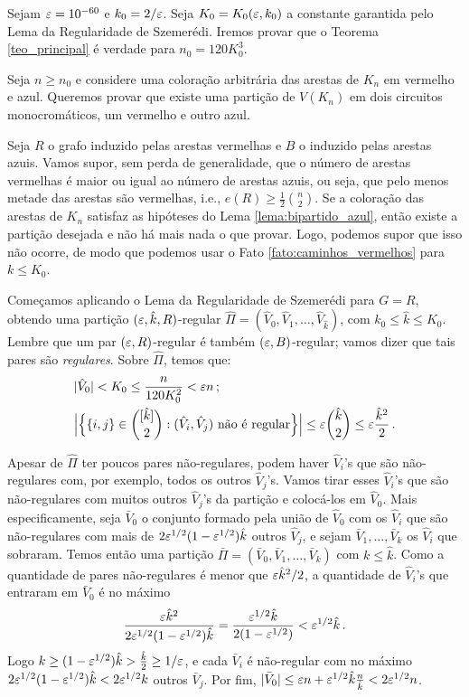 Sejam $\varepsilon = 10^{-60}$ e $k_0 = 2/\varepsilon$. Seja $K_0 = K_0(\varepsilon, k_0)$ a constante garantida pelo Lema da Regularidade de Szemerédi. Iremos provar que o Teorema \ref{teo_principal} é verdade para $n_0 = 120K_0^3$.

Seja $n\geq n_0$ e considere uma coloração arbitrária das arestas de $K_n$ em vermelho e azul. Queremos provar que existe uma partição de $V(K_n)$ em dois circuitos monocromáticos, um vermelho e outro azul.

Seja $R$ o grafo induzido pelas arestas vermelhas e $B$ o induzido pelas arestas azuis. Vamos supor, sem perda de generalidade, que o número de arestas vermelhas é maior ou igual ao número de arestas azuis, ou seja, que pelo menos metade das arestas são vermelhas, i.e., $e(R)\geq \frac{1}{2}\binom{n}{2}$. 
Se a coloração das arestas de $K_n$ satisfaz as hipóteses do Lema \ref{lema:bipartido_azul}, então existe a partição desejada e não há mais nada o que provar. Logo, podemos supor que isso não ocorre, de modo que podemos usar o Fato \ref{fato:caminhos_vermelhos} para $k\leq K_0$.

Começamos aplicando o Lema da Regularidade de Szemerédi para $G = R$, obtendo uma partição $(\varepsilon, \hat{k}, R)$-regular $\hat{\Pi} = (\hat{V}_0, \hat{V}_1, \dots, \hat{V}_{\hat{k}})$, com $k_0\leq \hat{k}\leq K_0$. Lembre que um par $(\varepsilon, R)$-regular é também $(\varepsilon, B)$-regular; vamos dizer que tais pares são \emph{regulares}. Sobre $\hat{\Pi}$, temos que:
\begin{align*}
	&|\hat{V}_0|<K_0\leq \frac{n}{120K_0^2}<\varepsilon n\,;\\
	&\Big|\Big\{\{i,j\}\in\binom{[\hat{k}]}{2}: (\hat{V}_i, \hat{V}_j) \text{ não é regular}\Big\}\Big| \leq \varepsilon\binom{\hat{k}}{2}\leq \varepsilon\frac{\hat{k}^2}{2}\,.
\end{align*}


Apesar de $\hat{\Pi}$ ter poucos pares não-regulares, podem haver $\hat{V}_i$'s que são não-regulares com, por exemplo, todos os outros $\hat{V}_j$'s. Vamos tirar esses $\hat{V}_i$'s que são não-regulares com muitos outros $\hat{V}_j$'s da partição e colocá-los em $\hat{V}_0$. Mais especificamente, seja $\bar{V}_0$ o conjunto formado pela união de $\hat{V}_0$ com os $\hat{V}_i$ que são não-regulares com mais de $2\varepsilon^{1/2}(1-\varepsilon^{1/2})\hat{k}$ outros $\hat{V}_j$, e sejam $\bar{V}_1, \dots, \bar{V}_k$ os $\hat{V}_i$ que sobraram. Temos então uma partição $\bar{\Pi} = (\bar{V}_0, \bar{V}_1, \dots, \bar{V}_k)$ com $k\leq \hat{k}$. Como a quantidade de pares não-regulares é menor que $\varepsilon\hat{k}^2/2$, a quantidade de $\hat{V}_i$'s que entraram em $\bar{V}_0$ é no máximo
\[
	\frac{\varepsilon\hat{k}^2}{2\varepsilon^{1/2}(1-\varepsilon^{1/2})\hat{k}} = \frac{\varepsilon^{1/2}\hat{k}}{2(1-\varepsilon^{1/2})} < \varepsilon^{1/2}\hat{k}\,.
\]
Logo $k\geq(1-\varepsilon^{1/2})\hat{k}>\frac{\hat{k}}{2}\geq 1/\varepsilon$, e cada $\bar{V}_i$ é não-regular com no máximo $2\varepsilon^{1/2}(1-\varepsilon^{1/2})\hat{k} < 2\varepsilon^{1/2}k$ outros $\bar{V}_j$. Por fim, $|\bar{V}_0|\leq \varepsilon n + \varepsilon^{1/2}\hat{k}\frac{n}{\hat{k}}<2\varepsilon^{1/2}n$.

